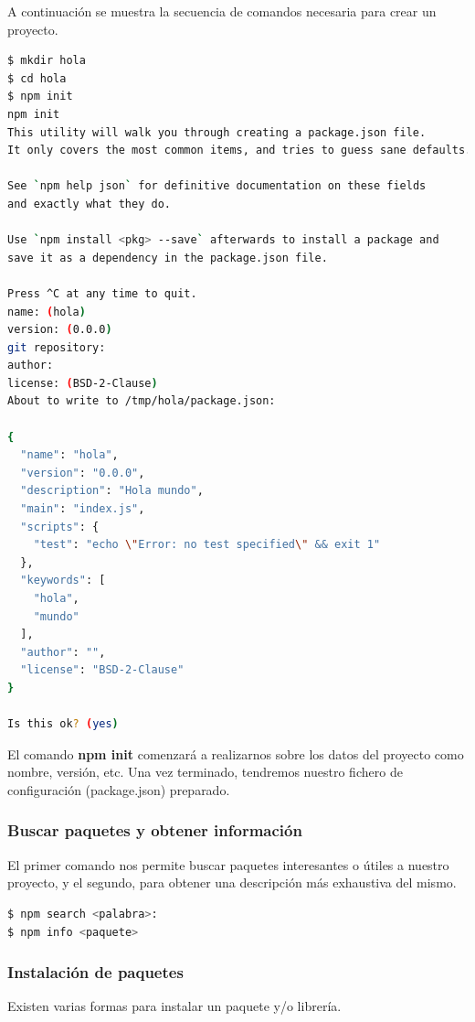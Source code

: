 A continuación se muestra la secuencia de comandos necesaria para crear un proyecto.

\begin{lstlisting}[language=bash, numbers=none]
$ mkdir hola
$ cd hola
$ npm init
npm init
This utility will walk you through creating a package.json file.
It only covers the most common items, and tries to guess sane defaults.

See `npm help json` for definitive documentation on these fields
and exactly what they do.

Use `npm install <pkg> --save` afterwards to install a package and
save it as a dependency in the package.json file.

Press ^C at any time to quit.
name: (hola) 
version: (0.0.0) 
git repository: 
author: 
license: (BSD-2-Clause) 
About to write to /tmp/hola/package.json:

{
  "name": "hola",
  "version": "0.0.0",
  "description": "Hola mundo",
  "main": "index.js",
  "scripts": {
    "test": "echo \"Error: no test specified\" && exit 1"
  },
  "keywords": [
    "hola",
    "mundo"
  ],
  "author": "",
  "license": "BSD-2-Clause"
}

Is this ok? (yes) 
\end{lstlisting}

El comando \textbf{npm init} comenzará a realizarnos sobre los datos del proyecto como nombre, versión, etc. Una vez terminado, tendremos nuestro fichero de configuración (package.json) preparado.

\subsubsection{Buscar paquetes y obtener información}

El primer comando nos permite buscar paquetes interesantes o útiles a nuestro proyecto, y el segundo, para obtener una descripción más exhaustiva del mismo.

\begin{lstlisting}[language=bash, numbers=none]
$ npm search <palabra>:
$ npm info <paquete>
\end{lstlisting}

\subsubsection{Instalación de paquetes}

Existen varias formas para instalar un paquete y/o librería. 

